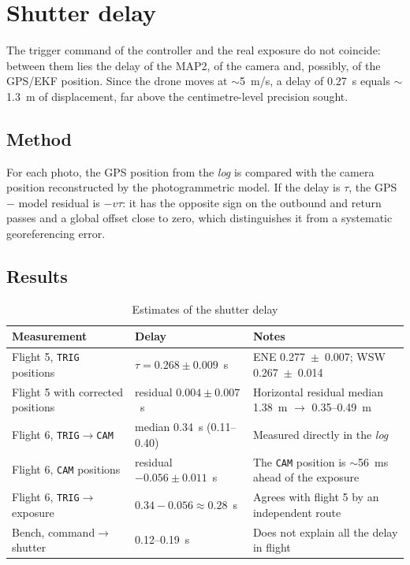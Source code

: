 \section{Shutter delay}
\label{sec:retard-obturador}

The trigger command of the controller and the real exposure do not coincide: between them lies the delay of the MAP2, of the camera and, possibly, of the GPS/EKF position. Since the drone moves at $\sim$5~m/s, a delay of 0.27~s equals $\sim$1.3~m of displacement, far above the centimetre-level precision sought.

\subsection{Method}

For each photo, the GPS position from the \emph{log} is compared with the camera position reconstructed by the photogrammetric model. If the delay is $\tau$, the GPS $-$ model residual is $-v\tau$: it has the opposite sign on the outbound and return passes and a global offset close to zero, which distinguishes it from a systematic georeferencing error.

\subsection{Results}

\begin{table}[H]
    \centering
    \caption{Estimates of the shutter delay}
    \label{tab:retard}
    \small
    \begin{tabular}{P{5.2cm}P{4.2cm}P{4.6cm}}
        \toprule
        Measurement & Delay & Notes \\
        \midrule
        Flight 5, \texttt{TRIG} positions & $\tau = 0.268 \pm 0.009$~s & ENE 0.277~$\pm$~0.007; WSW 0.267~$\pm$~0.014 \\
        Flight 5 with corrected positions & residual $0.004 \pm 0.007$~s & Horizontal residual median 1.38~m $\rightarrow$ 0.35--0.49~m \\
        Flight 6, \texttt{TRIG}$\rightarrow$\texttt{CAM} & median 0.34~s (0.11--0.40) & Measured directly in the \emph{log} \\
        Flight 6, \texttt{CAM} positions & residual $-0.056 \pm 0.011$~s & The \texttt{CAM} position is $\sim$56~ms ahead of the exposure \\
        Flight 6, \texttt{TRIG}$\rightarrow$exposure & $0.34 - 0.056 \approx 0.28$~s & Agrees with flight 5 by an independent route \\
        Bench, command$\rightarrow$shutter & 0.12--0.19~s & Does not explain all the delay in flight \\
        \bottomrule
    \end{tabular}
\end{table}

